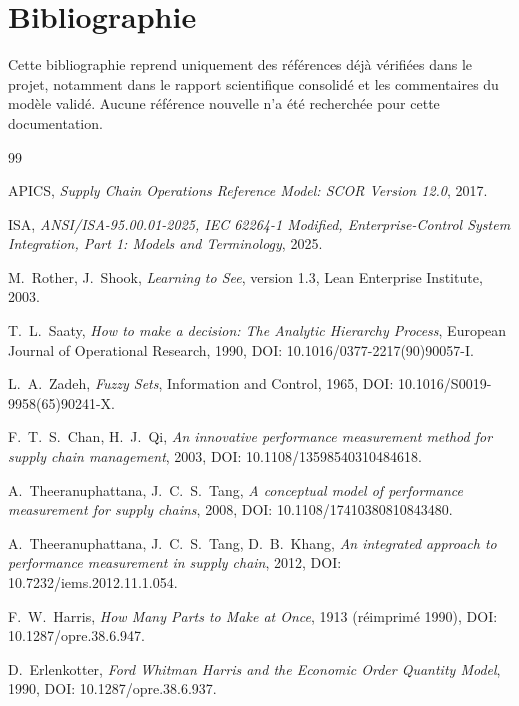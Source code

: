 \chapter*{Bibliographie}

Cette bibliographie reprend uniquement des références déjà vérifiées dans le projet, notamment dans le rapport scientifique consolidé et les commentaires du modèle validé. Aucune référence nouvelle n'a été recherchée pour cette documentation.

\begin{thebibliography}{99}

APICS,
\textit{Supply Chain Operations Reference Model: SCOR Version 12.0},
2017.

ISA,
\textit{ANSI/ISA-95.00.01-2025, IEC 62264-1 Modified, Enterprise-Control System Integration, Part 1: Models and Terminology},
2025.

M.~Rother, J.~Shook,
\textit{Learning to See}, version 1.3,
Lean Enterprise Institute,
2003.

T.~L.~Saaty,
\textit{How to make a decision: The Analytic Hierarchy Process},
European Journal of Operational Research,
1990,
DOI: 10.1016/0377-2217(90)90057-I.

L.~A.~Zadeh,
\textit{Fuzzy Sets},
Information and Control,
1965,
DOI: 10.1016/S0019-9958(65)90241-X.

F.~T.~S.~Chan, H.~J.~Qi,
\textit{An innovative performance measurement method for supply chain management},
2003,
DOI: 10.1108/13598540310484618.

A.~Theeranuphattana, J.~C.~S.~Tang,
\textit{A conceptual model of performance measurement for supply chains},
2008,
DOI: 10.1108/17410380810843480.

A.~Theeranuphattana, J.~C.~S.~Tang, D.~B.~Khang,
\textit{An integrated approach to performance measurement in supply chain},
2012,
DOI: 10.7232/iems.2012.11.1.054.

F.~W.~Harris,
\textit{How Many Parts to Make at Once},
1913 (réimprimé 1990),
DOI: 10.1287/opre.38.6.947.

D.~Erlenkotter,
\textit{Ford Whitman Harris and the Economic Order Quantity Model},
1990,
DOI: 10.1287/opre.38.6.937.

\end{thebibliography}
